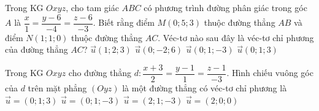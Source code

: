 	\begin{ex}%
	Trong KG $Oxyz$, cho tam giác $ABC$ có phương trình đường phân giác trong góc $A$ là $\dfrac{x}{1} = \dfrac{y - 6}{-4} = \dfrac{z - 6}{-3}$. Biết rằng điểm $M(0; 5; 3)$ thuộc đường thẳng $AB$ và điểm $N(1; 1; 0)$ thuộc đường thẳng $AC$. Véc-tơ nào sau đây là véc-tơ chỉ phương của đường thẳng $AC$?
	\choice
	{$\overrightarrow{u}(1; 2; 3)$}
	{$\overrightarrow{u}(0; -2; 6)$}
	{$\overrightarrow{u}(0; 1; -3)$}
	{\True $\overrightarrow{u}(0; 1; 3)$}
	\end{ex}
	\begin{ex}%
	Trong KG $Oxyz$ cho đường thẳng $d \colon \dfrac{x+3}{2} = \dfrac{y-1}{1}=\dfrac{z-1}{-3}$. Hình chiếu vuông góc của $d$ trên mặt phẳng $(Oyz)$ là một đường thẳng có véc-tơ chỉ phương là
	\choice
	{$\overrightarrow{u}=(0;1;3)$}
	{\True $\overrightarrow{u}=(0;1;-3)$}
	{$\overrightarrow{u}=(2;1;-3)$}
	{$\overrightarrow{u}=(2;0;0)$}
	\end{ex}
